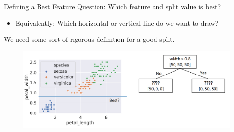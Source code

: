 \documentclass[aspectratio=169]{../latex_main/tntbeamer}  %
\begin{document}
	
	\begin{frame}{Defining a Best Feature}
	    Question: Which feature and split value is best?
	    \begin{itemize}
	        \item  Equivalently: Which horizontal or vertical line do we want to draw?
	    \end{itemize}
	   \alert{We need some sort of rigorous definition for a good split.}
	    \begin{figure}
	        \centering
	        \includegraphics[scale=.4]{figure_tree/Bild46}
	    \end{figure}
	\end{frame}
	
	
	
\end{document}
